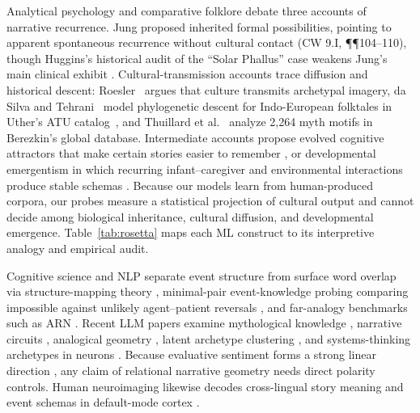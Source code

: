 \documentclass[conference]{IEEEtran}
\begin{document}
Analytical psychology and comparative folklore debate three accounts of narrative recurrence. Jung proposed inherited formal possibilities, pointing to apparent spontaneous recurrence without cultural contact \cite{jung1968archetypes} (CW 9.I, \P\P104--110), though Huggins's historical audit of the ``Solar Phallus'' case weakens Jung's main clinical exhibit \cite{huggins2021jung}. Cultural-transmission accounts trace diffusion and historical descent: Roesler~\cite{roesler2012archetypes} argues that culture transmits archetypal imagery, da Silva and Tehrani~\cite{dasilva2016comparative} model phylogenetic descent for Indo-European folktales in Uther's ATU catalog~\cite{uther2004types}, and Thuillard et al.~\cite{thuillard2018large} analyze 2,264 myth motifs in Berezkin's global database. Intermediate accounts propose evolved cognitive attractors that make certain stories easier to remember \cite{goodwyn2010approaching,goodwyn2013recurrent}, or developmental emergentism in which recurring infant--caregiver and environmental interactions produce stable schemas \cite{hogenson2001baldwin,knox2003archetype}. Because our models learn from human-produced corpora, our probes measure a statistical projection of cultural output and cannot decide among biological inheritance, cultural diffusion, and developmental emergence. Table~\ref{tab:rosetta} maps each ML construct to its interpretive analogy and empirical audit.

Cognitive science and NLP separate event structure from surface word overlap via structure-mapping theory \cite{gentner1983structure}, minimal-pair event-knowledge probing comparing impossible against unlikely agent--patient reversals \cite{kauf2023event}, and far-analogy benchmarks such as ARN \cite{sourati2024arn}. Recent LLM papers examine mythological knowledge \cite{chelombitko2026cultural}, narrative circuits \cite{liu2026interpretable}, analogical geometry \cite{lee2025curious}, latent archetype clustering \cite{breen2026mathematical}, and systems-thinking archetypes in neurons \cite{nordfors2026archetypal,senge1990fifth}. Because evaluative sentiment forms a strong linear direction \cite{tigges2023linear,reagan2016emotional}, any claim of relational narrative geometry needs direct polarity controls. Human neuroimaging likewise decodes cross-lingual story meaning and event schemas in default-mode cortex \cite{dehghani2017decoding,baldassano2018representation,lee2022predicting}.
\end{document}
